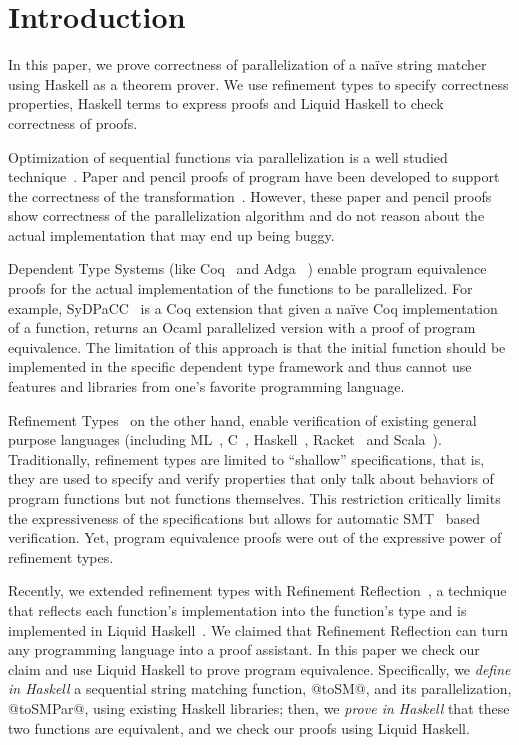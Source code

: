 \section{Introduction}\label{sec:intro}
In this paper, we prove correctness of parallelization of a na\"ive string matcher
using Haskell as a theorem prover.
%
We use refinement types to specify correctness properties,
Haskell terms to express proofs and Liquid Haskell to
check correctness of proofs.

Optimization of sequential functions via parallelization
is a well studied technique~\cite{jaja,blelloch}.
%
Paper and pencil proofs of program have been developed to support the
correctness of the transformation~\cite{Cole93parallelprogramming}.
%
However, these paper and pencil proofs
show correctness of the parallelization algorithm
and do not reason about the actual implementation
that may end up being buggy.

Dependent Type Systems (like Coq~\cite{coq-book} and Adga~\cite{agda} )
enable program equivalence proofs
for the actual implementation of the functions to be parallelized.
%
For example, SyDPaCC~\cite{SyDPaCC} is a Coq extension that
given a na\"ive Coq implementation of a function,
returns an Ocaml parallelized version with a proof of program equivalence.
%
The limitation of this approach is that the initial
function should be implemented in
the specific dependent type framework
and thus cannot use features and libraries from one's favorite
programming language.

Refinement Types~\cite{ConstableS87,FreemanPfenningDONTCITE91,Rushby98}
on the other hand, enable verification of existing general purpose languages
(including
ML~\cite{pfenningxi98,GordonRefinement09,LiquidPLDI08},
C~\cite{deputy,LiquidPOPL10},
Haskell~\cite{Vazou14},
Racket~\cite{RefinedRacket}
and Scala~\cite{refinedscala}).
%
Traditionally, refinement types are limited to
``shallow'' specifications,
that is, they are used to specify and verify properties
that only talk about behaviors of program functions
but not functions themselves.
%
This restriction critically limits the expressiveness
of the specifications
but allows for automatic SMT~\cite{SMTLIB2} based verification.
%
Yet, program equivalence proofs were out of the expressive
power of refinement types.

Recently, we extended refinement types
with Refinement Reflection~\cite{reflection},
a technique that reflects each function's implementation
into the function's type
and is implemented in Liquid Haskell~\cite{Vazou14}.
%
We claimed that Refinement Reflection can turn any programming
language into a proof assistant.
%
In this paper we check our claim and use Liquid Haskell
to prove program equivalence.
%
Specifically,
we \textit{define in Haskell}
a sequential string matching function, @toSM@, and its parallelization, @toSMPar@,
using existing Haskell libraries; then,
we \textit{prove in Haskell} that these two functions are equivalent,
and we check our proofs using Liquid Haskell.

